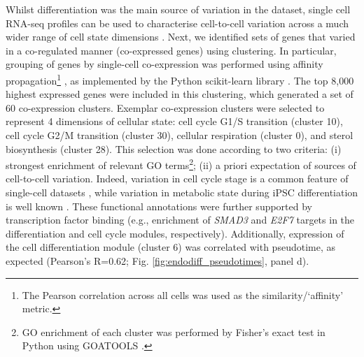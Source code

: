Whilst differentiation was the main source of variation in the dataset, single cell RNA-seq profiles can be used to characterise cell-to-cell variation across a much wider range of cell state dimensions \cite{buettner2015computational, buettner2017f, fan2016characterizing}. 
Next, we identified sets of genes that varied in a co-regulated manner (co-expressed genes) using clustering.
In particular, grouping of genes by single-cell co-expression was performed using affinity propagation\footnote{The Pearson correlation across all cells was used as the similarity/‘affinity’ metric.} \cite{frey2007clustering}, as implemented by the Python scikit-learn library \cite{garreta2013learning}. 
The top 8,000 highest expressed genes were included in this clustering,
which generated a set of 60 co-expression clusters. 
Exemplar co-expression clusters were selected to represent 4 dimensions of
cellular state: cell cycle G1/S transition (cluster
10), cell cycle G2/M transition (cluster 30), cellular respiration (cluster 0), and
sterol biosynthesis (cluster 28). 
This selection was done according to two criteria: (i) strongest enrichment of relevant GO terms\footnote{GO enrichment of each cluster was performed by Fisher’s exact test in Python using GOATOOLS \cite{klopfenstein2018goatools}.};
(ii) a priori expectation of sources of cell-to-cell variation. 
Indeed, variation in cell cycle stage is a common feature of single-cell datasets \cite{buettner2015computational}, while variation in metabolic state during iPSC differentiation is well known \cite{xu2013mitochondrial}.
These functional annotations were further supported by transcription factor binding (e.g., enrichment of \textit{SMAD3} and \textit{E2F7} targets in the differentiation and cell cycle modules, respectively). 
Additionally, expression of the cell differentiation module (cluster 6) was correlated with pseudotime, as expected (Pearson's R=0.62; Fig. \ref{fig:endodiff_pseudotimes}, panel d).\\

